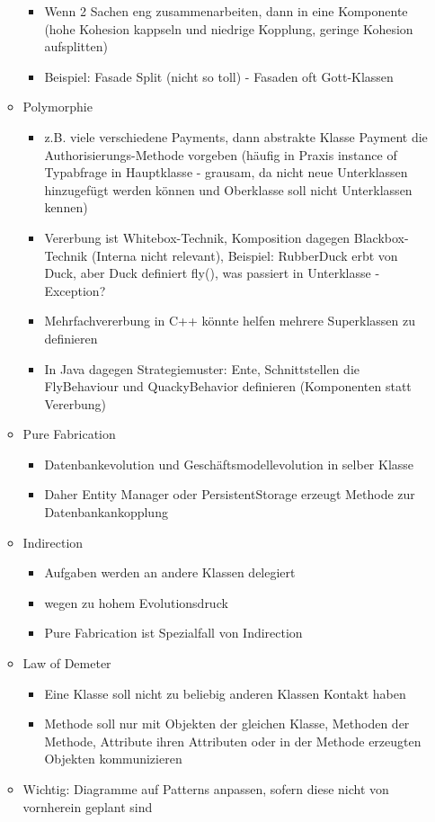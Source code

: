 \documentclass[paper=a4, fontsize=11pt]{scrartcl} %
\numberwithin{equation}{section} %
\numberwithin{figure}{section} %
\numberwithin{table}{section} %
\begin{document}
\begin{itemize}
\begin{itemize}
\begin{itemize}
      \item Wenn 2 Sachen eng zusammenarbeiten, dann in eine Komponente (hohe Kohesion kappseln und niedrige Kopplung, geringe Kohesion aufsplitten)
      \item Beispiel: Fasade Split (nicht so toll) - Fasaden oft Gott-Klassen
    \end{itemize}
    \item Polymorphie
    \begin{itemize}
      \item z.B. viele verschiedene Payments, dann abstrakte Klasse Payment die Authorisierungs-Methode vorgeben (häufig in Praxis instance of Typabfrage in Hauptklasse - grausam, da nicht neue Unterklassen hinzugefügt werden können und Oberklasse soll nicht Unterklassen kennen)
      \item Vererbung ist Whitebox-Technik, Komposition dagegen Blackbox-Technik (Interna nicht relevant), Beispiel: RubberDuck erbt von Duck, aber Duck definiert fly(), was passiert in Unterklasse - Exception?
      \item Mehrfachvererbung in C++ könnte helfen mehrere Superklassen zu definieren
      \item In Java dagegen Strategiemuster: Ente, Schnittstellen die FlyBehaviour und QuackyBehavior definieren (Komponenten statt Vererbung)
    \end{itemize}
    \item Pure Fabrication
    \begin{itemize}
      \item Datenbankevolution und Geschäftsmodellevolution in selber Klasse
      \item Daher Entity Manager oder PersistentStorage erzeugt Methode zur Datenbankankopplung
    \end{itemize}
    \item Indirection
    \begin{itemize}
      \item Aufgaben werden an andere Klassen delegiert
      \item wegen zu hohem Evolutionsdruck
      \item Pure Fabrication ist Spezialfall von Indirection
    \end{itemize}
    \item Law of Demeter
    \begin{itemize}
      \item Eine Klasse soll nicht zu beliebig anderen Klassen Kontakt haben
      \item Methode soll nur mit Objekten der gleichen Klasse, Methoden der Methode, Attribute ihren Attributen oder in der Methode erzeugten Objekten kommunizieren
    \end{itemize}
    \item Wichtig: Diagramme auf Patterns anpassen, sofern diese nicht von vornherein geplant sind
  \end{itemize}
\end{itemize}
\end{document}

